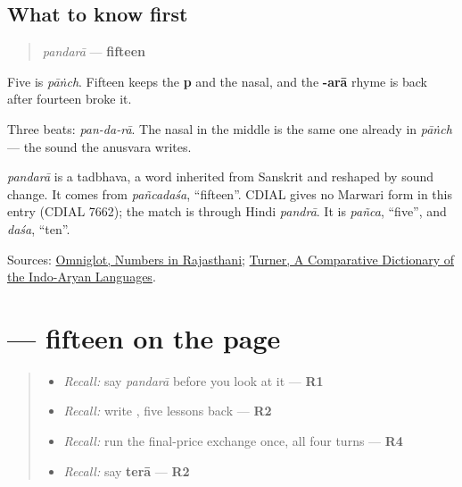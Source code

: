 \subsection*{What to know first}
\begin{quote}
\emph{pandarā} — \textbf{fifteen}
\end{quote}

Five is \emph{pāṅch}. Fifteen keeps the \textbf{p} and the nasal, and the \textbf{-arā} rhyme is back after fourteen broke it.

Three beats: \emph{pan-da-rā}. The nasal in the middle is the same one already in \emph{pāṅch} — the sound the anusvara writes.

\begin{cousinweb}
\emph{pandarā} is a tadbhava, a word inherited from Sanskrit and reshaped by sound change. It comes from \emph{pañcadaśa}, \textquotedblleft{}fifteen\textquotedblright{}. CDIAL gives no Marwari form in this entry (CDIAL 7662); the match is through Hindi \emph{pandrā}. It is \emph{pañca}, \textquotedblleft{}five\textquotedblright{}, and \emph{daśa}, \textquotedblleft{}ten\textquotedblright{}.
\end{cousinweb}

\begin{tcolorbox}[breakable,colback=teal!4,colframe=teal!35!black,title={Before you move on}]
Sources: \href{https://www.omniglot.com/language/numbers/rajasthani.htm}{Omniglot, Numbers in Rajasthani}; \href{https://dsal.uchicago.edu/dictionaries/soas/}{Turner, A Comparative Dictionary of the Indo-Aryan Languages}.
\end{tcolorbox}
\section[\texorpdfstring{\mw{पंदरा} (pandarā)}{पंदरा (pandarā)}]{ — fifteen on the page}

\label{lesson:MW-C37-pandara}



\begin{quote}
\begin{itemize}
\raggedright
  \item \emph{Recall:} say \emph{pandarā} before you look at it — \textbf{R1}
  \item \emph{Recall:} write \textbf{}, five lessons back — \textbf{R2}
  \item \emph{Recall:} run the final-price exchange once, all four turns — \textbf{R4}
  \item \emph{Recall:} say \textbf{terā} — \textbf{R2}
\end{itemize}
\end{quote}

